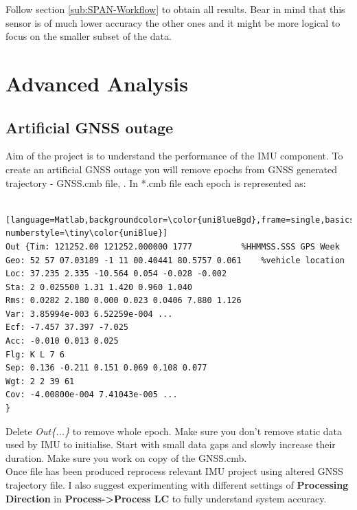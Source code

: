 \documentclass[11pt,fleqn]{book} %
\begin{document}
Follow section \ref{sub:SPAN-Workflow} to obtain all results. Bear in mind that this sensor is of much lower accuracy the other ones and it might be more logical to focus on the smaller subset of the data.




\part{Advanced Analysis}

\chapter{Artificial GNSS outage\label{sec:SIMUlating-GNSS-outage}}

Aim of the project is to understand the performance of the IMU component. To create an artificial GNSS outage you will remove epochs from GNSS generated trajectory - GNSS.cmb file, . In {*}.cmb file each epoch is represented as:
\bigskip
\begin{lstlisting} [language=Matlab,backgroundcolor=\color{uniBlueBgd},frame=single,basicstyle=\footnotesize,numbers=left,numbersep=5pt, numberstyle=\tiny\color{uniBlue}]
Out {Tim: 121252.00 121252.000000 1777 			%HHMMSS.SSS GPS Week
Geo: 52 57 07.03189 -1 11 00.40441 80.5757 0.061 	%vehicle location
Loc: 37.235 2.335 -10.564 0.054 -0.028 -0.002 	
Sta: 2 0.025500 1.31 1.420 0.960 1.040 	
Rms: 0.0282 2.180 0.000 0.023 0.0406 7.880 1.126 	
Var: 3.85994e-003 6.52259e-004 ...	
Ecf: -7.457 37.397 -7.025 	
Acc: -0.010 0.013 0.025 	
Flg: K L 7 6 	
Sep: 0.136 -0.211 0.151 0.069 0.108 0.077 	
Wgt: 2 2 39 61 	
Cov: -4.00800e-004 7.41043e-005 ...
}
\end{lstlisting}
\bigskip

Delete \emph{Out\{...\}} to remove whole epoch. Make sure you don't remove static data used by IMU to initialise. Start with small data gaps and slowly increase their duration. Make sure you work on copy of the GNSS.cmb.\\

Once file has been produced reprocess relevant IMU project using altered GNSS trajectory file. I also suggest experimenting with different settings of \textbf{Processing Direction} in \textbf{Process->Process LC} to fully understand system accuracy.
\end{document}

